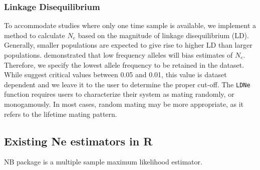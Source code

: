 \documentclass[english,titlepage]{article}
\begin{document}
\subsubsection*{Linkage Disequilibrium}

To accommodate studies where only one time sample is available, we implement a method to calculate $N_e$ based on the magnitude of linkage disequilibrium (LD). Generally, smaller populations are expected to give rise to higher LD than larger populations. 
\cite{Waples2006} demonstrated that low frequency alleles will bias estimates of $N_e$. Therefore, we specify the lowest allele frequency to be retained in the dataset.  While \cite{Waples2008} suggest critical values between 0.05 and 0.01, this value is dataset dependent and we leave it to the user to determine the proper cut-off. The \texttt{LDNe} function requires users to characterize their system as mating randomly, or monogamously. In most cases, random mating may be more appropriate, as it refers to the lifetime mating pattern. 

\subsection{Existing Ne estimators in R}
NB package is a multiple sample maximum likelihood estimator\citep{Hui2014}.
  


\end{document}
